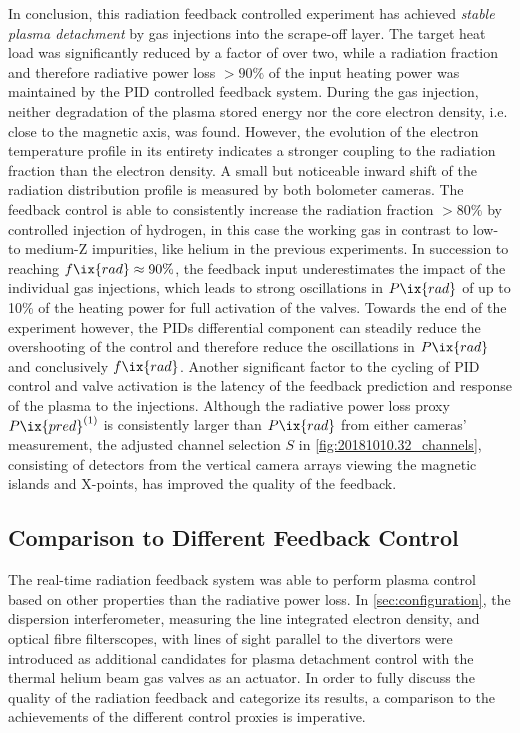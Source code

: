             In conclusion, this radiation feedback controlled experiment has achieved \textit{stable plasma detachment} by gas injections into the scrape-off layer. The target heat load was significantly reduced by a factor of over two, while a radiation fraction and therefore radiative power loss $>90\%$ of the input heating power was maintained by the PID controlled feedback system. During the gas injection, neither degradation of the plasma stored energy nor the core electron density, i.e. close to the magnetic axis, was found. However, the evolution of the electron temperature profile in its entirety indicates a stronger coupling to the radiation fraction than the electron density. A small but noticeable inward shift of the radiation distribution profile is measured by both bolometer cameras. The feedback control is able to consistently increase the radiation fraction $>80\%$ by controlled injection of hydrogen, in this case the working gas in contrast to low- to medium-Z impurities, like helium in the previous experiments. In succession to reaching $f\ix{rad}\approx90\%$, the feedback input underestimates the impact of the individual gas injections, which leads to strong oscillations in $P\ix{rad}$ of up to 10\% of the heating power for full activation of the valves. Towards the end of the experiment however, the PIDs differential component can steadily reduce the overshooting of the control and therefore reduce the oscillations in $P\ix{rad}$ and conclusively $f\ix{rad}$. Another significant factor to the cycling of PID control and valve activation is the latency of the feedback prediction and response of the plasma to the injections. Although the radiative power loss proxy $P\ix{pred}^{\left(1\right)}$ is consistently larger than $P\ix{rad}$ from either cameras' measurement, the adjusted channel selection $S$ in \cref{fig:20181010.32_channels}, consisting of detectors from the vertical camera arrays viewing the magnetic islands and X-points, has improved the quality of the feedback.%
%
        \subsection{Comparison to Different Feedback Control}\label{subsec:densityfeedback}%
%
            The real-time radiation feedback system was able to perform plasma control based on other properties than the radiative power loss. In \cref{sec:configuration}, the dispersion interferometer, measuring the line integrated electron density, and optical fibre filterscopes, with lines of sight parallel to the divertors were introduced as additional candidates for plasma detachment control with the thermal helium beam gas valves as an actuator. In order to fully discuss the quality of the radiation feedback and categorize its results, a comparison to the achievements of the different control proxies is imperative.%
%
